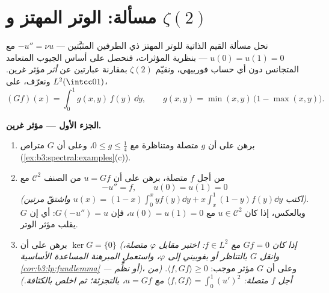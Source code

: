 \section{مسألة: الوتر المهتز و
\texorpdfstring{$\zeta(2)$}{زيتا(2)}}

\begin{problem}\label{pb:b3:spectral:1}
نحل مسألة القيم الذاتية للوتر المهتز ذي الطرفين المثبَّتين ---
$-u'' = \nu u$ مع $u(0) = u(1) = 0$ --- بنظرية المؤثرات، فنحصل على أساس
الجيوب المتعامد المتجانس دون أي حساب فورييهي، ونقيّم $\zeta(2)$
بمقارنة عبارتين عن \emph{أثر} مؤثر غرين. ونعرّف، على
$L^2(\intcc01)$،
\[
(Gf)(x) = \int_0^1 g(x,y)\,f(y)\,\dd y,
\qquad
g(x, y) = \min(x,y)\,\bigl(1 - \max(x,y)\bigr).
\]

\medskip
\noindent\textbf{الجزء الأول --- مؤثر غرين.}
\begin{enumerate}
  \item برهن على أن $g$ متصلة ومتناظرة مع $0 \leq g
        \leq \frac14$، وعلى أن $G$
        متراص  (\cref{ex:b3:spectral:examples}(c)).
  \item من أجل $f$ متصلة، برهن على أن $u = Gf$ من الصنف $\mathcal
        C^2$
        مع
        \[
        -u'' = f, \qquad u(0) = u(1) = 0
        \]
        \emph{(اكتب $u(x) = (1-x)\int_0^xyf(y)\dd y +
        x\int_x^1(1-y)f(y)\dd y$ واشتقّ مرتين)}. وبالعكس، إذا كان
        $u \in \mathcal C^2$ مع $u(0) = u(1)
        = 0$، فإن $G(-u'') = u$: أي إن $G$ يقلب
        مؤثر الوتر.
  \item برهن على أن $\ker G = \{0\}$ \emph{(إذا كان $Gf = 0$
        مع $f \in
        L^2$: اختبر مقابل $\varphi$ متصلة، وانقل $G$
        بالتناظر أو بفوبيني إلى $\varphi$، واستعمل المبرهنة
        المساعدة الأساسية \cref{cor:b3:lp:fundlemma} --- أو نظِّم)}، وعلى أن
        $G$ مؤثر موجب: $\langle f, Gf\rangle \geq 0$. \emph{(من أجل $f$ متصلة:
        $\langle f, Gf\rangle = \int_0^1 (u')^2$ مع $u
        = Gf$، بالتجزئة؛ ثم اخلص بالكثافة.)}
\end{enumerate}


\end{problem}
